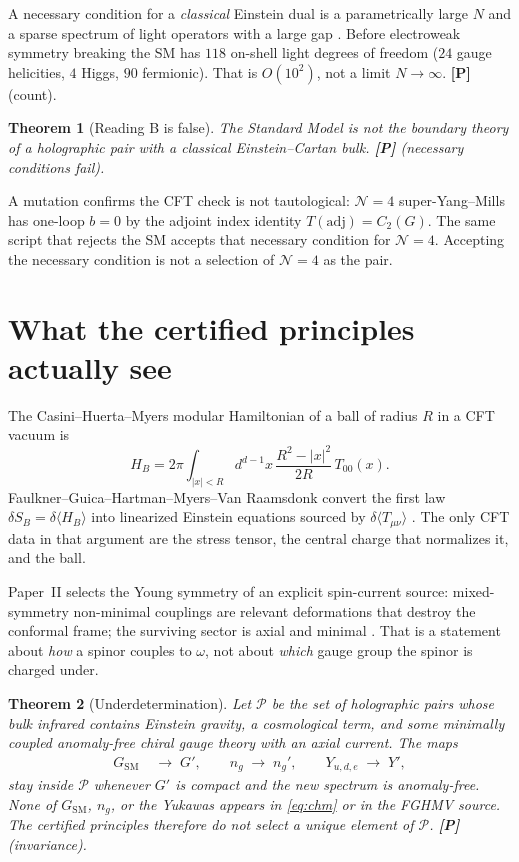 \documentclass[11pt]{article}
\newtheorem{theorem}{Theorem}[section]
\theoremstyle{definition}
\newcommand{\pP}{\textbf{[P]}}
\begin{document}
A necessary condition for a \emph{classical} Einstein dual is a
parametrically large $N$ and a sparse spectrum of light operators
with a large gap \cite{Heemskerk2009}. Before electroweak symmetry
breaking the SM has $118$ on-shell light degrees of freedom
($24$ gauge helicities, $4$ Higgs, $90$ fermionic). That is
$O(10^2)$, not a limit $N\to\infty$. \pP{} (count).

\begin{theorem}[Reading B is false]
\label{thm:B}
The Standard Model is not the boundary theory of a holographic pair
with a classical Einstein--Cartan bulk. \pP{} (necessary conditions
fail).
\end{theorem}

A mutation confirms the CFT check is not tautological: $\mathcal{N}=4$
super-Yang--Mills has one-loop $b=0$ by the adjoint index identity
$T(\mathrm{adj})=C_2(G)$. The same script that rejects the SM accepts
that necessary condition for $\mathcal{N}=4$. Accepting the necessary
condition is not a selection of $\mathcal{N}=4$ as the pair.

\section{What the certified principles actually see}

The Casini--Huerta--Myers modular Hamiltonian of a ball of radius
$R$ in a CFT vacuum is \cite{CHM2011}
\begin{equation}
H_B
=
2\pi\int_{\lvert x\rvert<R}\!d^{d-1}x\,
\frac{R^2-\lvert x\rvert^2}{2R}\,T_{00}(x).
\label{eq:chm}
\end{equation}
Faulkner--Guica--Hartman--Myers--Van Raamsdonk convert the first law
$\delta S_B=\delta\langle H_B\rangle$ into linearized Einstein
equations sourced by $\delta\langle T_{\mu\nu}\rangle$
\cite{FGHMV2014}. The only CFT data in that argument are the stress
tensor, the central charge that normalizes it, and the ball.

Paper~II selects the Young symmetry of an explicit spin-current
source: mixed-symmetry non-minimal couplings are relevant
deformations that destroy the conformal frame; the surviving sector
is axial and minimal \cite{McGwierII}. That is a statement about
\emph{how} a spinor couples to $\omega$, not about
\emph{which} gauge group the spinor is charged under.

\begin{theorem}[Underdetermination]
\label{thm:under}
Let $\mathcal{P}$ be the set of holographic pairs whose bulk
infrared contains Einstein gravity, a cosmological term, and some
minimally coupled anomaly-free chiral gauge theory with an axial
current. The maps
\begin{align*}
G_{\mathrm{SM}}
&\;\longrightarrow\;
G',
\qquad
n_g
\;\longrightarrow\;
n_g',
\qquad
Y_{u,d,e}
\;\longrightarrow\;
Y',
\end{align*}
stay inside $\mathcal{P}$ whenever $G'$ is compact and the new
spectrum is anomaly-free. None of $G_{\mathrm{SM}}$, $n_g$, or the
Yukawas appears in \eqref{eq:chm} or in the FGHMV source. The
certified principles therefore do not select a unique element of
$\mathcal{P}$. \pP{} (invariance).
\end{theorem}
\end{document}
